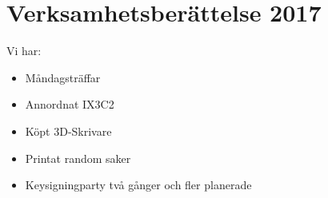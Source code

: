 \documentclass[a4paper,11pt,oneside]{article}
\begin{document}
\section*{Verksamhetsberättelse 2017}

Vi har: \\
\begin{itemize}
\item Måndagsträffar
\item Annordnat IX3C2
\item Köpt 3D-Skrivare
\item Printat random saker
\item Keysigningparty två gånger och fler planerade
\end{itemize}
\end{document}

